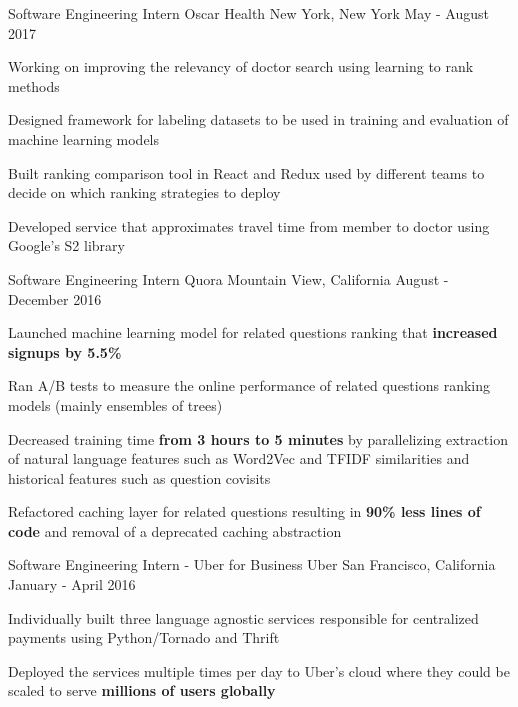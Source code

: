 \begin{cventries}
  \cventry
    {Software Engineering Intern}
    {Oscar Health}
    {New York, New York}
    {May - August 2017}
    {
      \begin{cvitems}
      \item Working on improving the relevancy of doctor search using learning to rank methods
      \item Designed framework for labeling datasets to be used in training and evaluation of machine learning models
      \item Built ranking comparison tool in React and Redux used by different teams to decide on which ranking strategies to deploy
      \item Developed service that approximates travel time from member to doctor using Google's S2 library
      \end{cvitems}
    }
  \cventry
    {Software Engineering Intern}
    {Quora}
    {Mountain View, California}
    {August - December 2016}
    {
      \begin{cvitems}
      \item Launched machine learning model for related questions ranking that \textbf{increased signups by 5.5\%}
      \item Ran A/B tests to measure the online performance of related questions ranking models (mainly ensembles of trees)
      \item Decreased training time \textbf{from 3 hours to 5 minutes} by parallelizing extraction of natural language features such as Word2Vec and TFIDF similarities and historical features such as question covisits
      \item Refactored caching layer for related questions resulting in \textbf{90\% less lines of code} and removal of a deprecated caching abstraction
      \end{cvitems}
    }
  \cventry
    {Software Engineering Intern - Uber for Business}
    {Uber}
    {San Francisco, California}
    {January - April 2016}
    {
      \begin{cvitems}
      \item Individually built three language agnostic services responsible for centralized payments using Python/Tornado and Thrift
      \item Deployed the services multiple times per day to Uber's cloud where they could be scaled to serve \textbf{millions of users globally}

\end{cvitems}}
\end{cventries}
